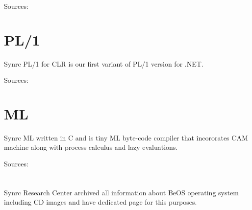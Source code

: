 \documentclass[11pt]{article}
\begin{document}
Sources: 

\section*{PL/1}
\paragraph{}
Synrc PL/1 for CLR is our first variant of PL/1 version for .NET.

Sources: 

\section*{ML}
\paragraph{}
Synrc ML written in C and is tiny ML byte-code compiler that incororates CAM machine
along with process calculus and lazy evaluations.

Sources: 

\section*{}
\paragraph{}
Synrc Research Center archived all information about BeOS operating system 
including CD images and have dedicated page for this purposes.



\end{document}
